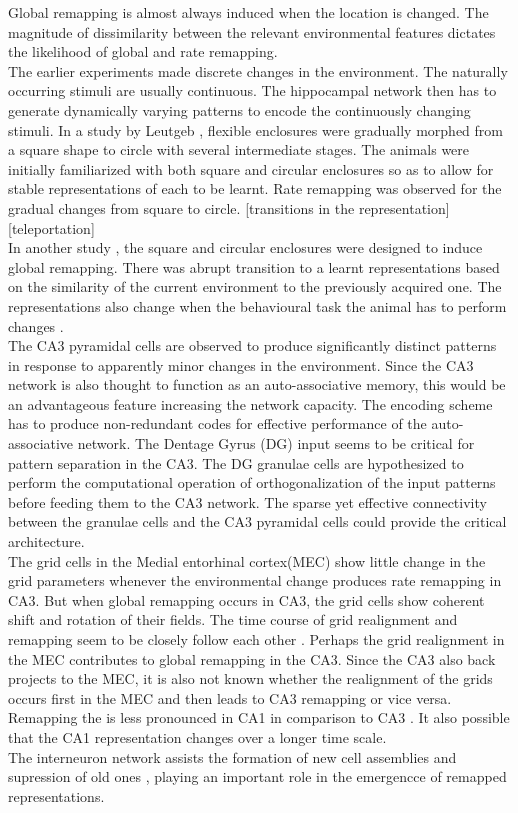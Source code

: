 Global remapping is almost always induced when the location is changed. The magnitude of dissimilarity between the relevant environmental features dictates the likelihood of global and rate remapping. \\
The earlier experiments made discrete changes in the environment. The naturally occurring stimuli are usually continuous. The hippocampal network then has to generate dynamically varying patterns to encode the continuously changing stimuli. In a study by Leutgeb \cite{Leutgeb2005}, flexible enclosures were gradually morphed from a square shape to circle with several intermediate stages. The animals were initially familiarized with both square and circular enclosures so as to allow for stable representations of each to be learnt. Rate remapping was observed for the gradual changes from square to circle.  [transitions in the representation] [teleportation]\\
In another study \cite{Wills2005}, the square and circular enclosures were designed to induce global remapping. There was abrupt transition to a learnt representations based on the similarity of the current environment to the previously acquired one. The representations also change when the behavioural task the animal has to perform changes \cite{Markus1995}. \\
The CA3 pyramidal cells are observed to produce significantly distinct patterns in response to apparently minor changes in the environment. Since the CA3 network is also thought to function as an auto-associative memory, this would be an advantageous feature increasing the network capacity. The encoding scheme has to produce non-redundant codes for effective performance of the auto-associative network. The Dentage Gyrus (DG) input seems to be critical for pattern separation in the CA3. The DG granulae cells are hypothesized to perform the computational operation of orthogonalization of the input patterns before feeding them to the CA3 network. The sparse yet effective connectivity between the granulae cells and the CA3 pyramidal cells could provide the critical architecture.\\ The grid cells in the Medial entorhinal cortex(MEC) show little change in the grid parameters whenever the environmental change produces rate remapping in CA3. But when global remapping occurs in CA3, the grid cells show coherent shift and rotation of their fields. The time course of grid realignment and remapping seem to be closely follow each other \cite{Fyhn2007}. Perhaps the grid realignment in the MEC contributes to global remapping in the CA3. Since the CA3 also back projects to the MEC, it is also not known whether the realignment of the grids occurs first in the MEC and then leads to CA3 remapping or vice versa. Remapping the is less pronounced in CA1 in comparison to CA3 \cite{Leutgeb2005a, Leutgeb2004}. It also possible that the CA1 representation changes over a longer time scale. \\ 
The interneuron network assists the formation of new cell assemblies and supression of old ones \cite{Dupret2013}, playing an important role in the emergencce of remapped representations.

